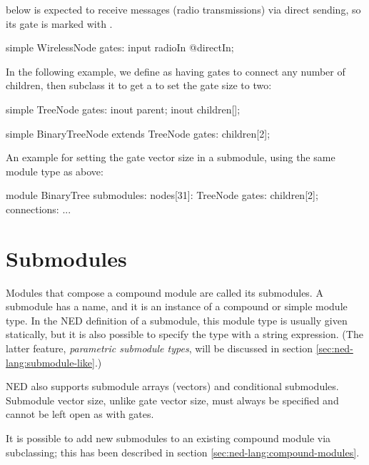  below is expected to receive messages (radio transmissions)
via direct sending, so its  gate is marked with .

\begin{ned}
simple WirelessNode {
    gates:
        input radioIn @directIn;
}
\end{ned}

In the following example, we define  as having gates to connect
any number of children, then subclass it to get a  to
set the gate size to two:

\begin{ned}
simple TreeNode {
    gates:
        inout parent;
        inout children[];
}

simple BinaryTreeNode extends TreeNode {
    gates:
        children[2];
}
\end{ned}

An example for setting the gate vector size in a submodule, using the same
 module type as above:

\begin{ned}
module BinaryTree {
    submodules:
        nodes[31]: TreeNode {
            gates:
                children[2];
        }
    connections:
        ...
}
\end{ned}



\section{Submodules}
\label{sec:ned-lang:submodules}

Modules that compose a compound module are called its submodules.
A submodule has a name, and it is an instance of a compound or simple
module type. In the NED definition of a submodule, this module type
is usually given statically, but it is also possible to specify the type
with a string expression. (The latter feature, \textit{parametric submodule
types}, will be discussed in section \ref{sec:ned-lang:submodule-like}.)

NED also supports submodule arrays (vectors) and conditional submodules.
Submodule vector size, unlike gate vector size, must always be specified
and cannot be left open as with gates.

It is possible to add new submodules to an existing compound module via
subclassing; this has been described in section
\ref{sec:ned-lang:compound-modules}.

